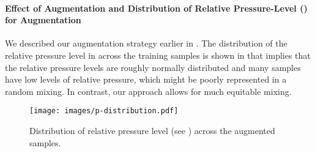 \documentclass{article}
\begin{document}
\paragraph{Effect of Augmentation and Distribution of Relative Pressure-Level () for Augmentation}
We described our augmentation strategy earlier in . The distribution of the relative pressure level  in  across the training samples is shown in  that implies that the relative pressure levels are roughly normally distributed and many samples have low levels of relative pressure, which might be poorly represented in a random mixing. In contrast, our approach allows for much equitable mixing.
\begin{figure}[ht]
    \centering
    \texttt{[image: images/p-distribution.pdf]}
    \caption{Distribution of relative pressure level (see ) across the augmented samples.}
    \label{fig:relative_gain_dist}
\end{figure}
\end{document}
